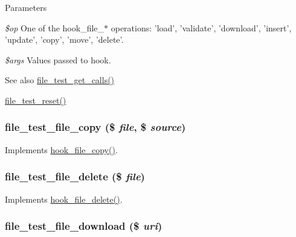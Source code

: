 \begin{DoxyParams}{Parameters}
\item[{\em \$op}]One of the hook\_\-file\_\-$\ast$ operations: 'load', 'validate', 'download', 'insert', 'update', 'copy', 'move', 'delete'. \item[{\em \$args}]Values passed to hook.\end{DoxyParams}
\begin{DoxySeeAlso}{See also}
\hyperlink{file__test_8module_a43842b551a9a076a33290c02b9c567b0}{file\_\-test\_\-get\_\-calls()} 

\hyperlink{file__test_8module_ac3231cdae85b5f6631a201a2f56e9d84}{file\_\-test\_\-reset()} 
\end{DoxySeeAlso}
\hypertarget{file__test_8module_af7f578a32030bdda21981e4453c1f6a2}{
\subsubsection[{file\_\-test\_\-file\_\-copy}]{\setlength{\rightskip}{0pt plus 5cm}file\_\-test\_\-file\_\-copy (\$ {\em file}, \/  \$ {\em source})}}
\label{file__test_8module_af7f578a32030bdda21981e4453c1f6a2}
Implements \hyperlink{group__hooks_ga49e2e5f9993e98da69c3434999242711}{hook\_\-file\_\-copy()}. \hypertarget{file__test_8module_a26c064534c5098f4d1956918a8f370fb}{
\subsubsection[{file\_\-test\_\-file\_\-delete}]{\setlength{\rightskip}{0pt plus 5cm}file\_\-test\_\-file\_\-delete (\$ {\em file})}}
\label{file__test_8module_a26c064534c5098f4d1956918a8f370fb}
Implements \hyperlink{group__hooks_gafa88683ad014451b3fbc9ca9bb80afdd}{hook\_\-file\_\-delete()}. \hypertarget{file__test_8module_a4692e5cdf927263bb8957f7f23218114}{
\subsubsection[{file\_\-test\_\-file\_\-download}]{\setlength{\rightskip}{0pt plus 5cm}file\_\-test\_\-file\_\-download (\$ {\em uri})}}
